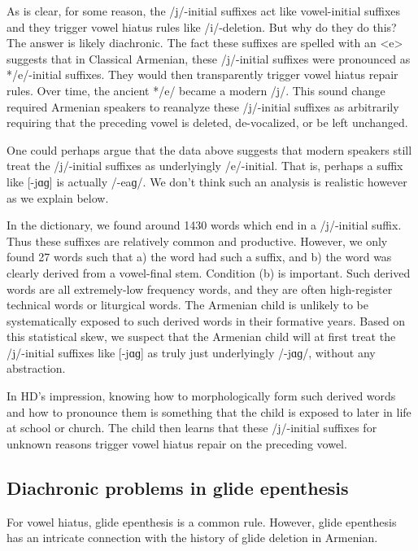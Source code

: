 {	
	
	
	
	As is clear, for some reason, the /j/-initial suffixes act like vowel-initial suffixes and they trigger vowel hiatus rules like /i/-deletion.  But why do they do this? The answer is likely diachronic. The fact these suffixes are spelled with an <e> suggests that in Classical Armenian, these /j/-initial suffixes were pronounced as */e/-initial suffixes. They would then transparently trigger vowel hiatus repair rules. Over time, the ancient */e/ became a modern /j/. This sound change required Armenian speakers to reanalyze these /j/-initial suffixes as arbitrarily requiring that the preceding vowel is deleted, de-vocalized, or be left unchanged.  
	
	One could perhaps argue that the data above suggests that modern speakers still treat the /j/-initial suffixes as underlyingly /e/-initial. That is, perhaps a suffix like [-jɑɡ] is actually /-eaɡ/. We don't think such an analysis is realistic however as we explain below. 
	
	
	In the \citeauthor{kouyoumdjian-1970-DictionaryArmenianEnglish} dictionary, we found around 1430 words which end in a /j/-initial suffix. Thus these suffixes are relatively common and productive. However, we only found 27 words such that a) the word had such a suffix, and b) the word was clearly derived from a vowel-final stem. Condition (b) is important. Such derived words are  all extremely-low frequency words, and they are often high-register technical words or liturgical words.  The Armenian child is unlikely to be systematically exposed to such derived words in their formative years.  Based on this statistical skew, we suspect that the Armenian child will at first treat the /j/-initial suffixes like [-jɑɡ] as truly just underlyingly /-jɑɡ/, without any abstraction. 
	
	In HD's impression, knowing how to morphologically form such derived words and how to pronounce them is something that the child is exposed to later in life at school or church. The child then learns that these /j/-initial suffixes for unknown reasons trigger vowel hiatus repair on the preceding vowel. 
	
	
	\subsection{Diachronic problems in glide epenthesis}\label{section:syllable:VowelHiatus:Diachrony}
	For vowel hiatus,  glide epenthesis is a common rule. However, glide epenthesis has an intricate connection with the history of glide deletion in Armenian.
	
}
